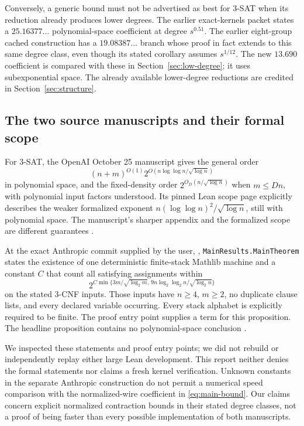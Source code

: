 Conversely, a generic bound must not be advertised as best for 3-SAT when
its reduction already produces lower degrees. The earlier exact-kernels
packet states a $25.16377\ldots$ polynomial-space coefficient at degree
$s^{0.51}$. The earlier eight-group cached construction has a
$19.08387\ldots$ branch whose proof in fact extends to this same degree
class, even though its stated corollary assumes $s^{1/12}$.
The new $13.690$ coefficient is compared with these in
Section~\ref{sec:low-degree}; it uses subexponential space.
The already available lower-degree reductions are credited in
Section~\ref{sec:structure}.

\subsection{The two source manuscripts and their formal scope}

For 3-SAT, the OpenAI October 25 manuscript gives the general order
\[
 (n+m)^{O(1)}2^{O(n\log\log n/\sqrt{\log n})}
\]
in polynomial space, and the fixed-density order
$2^{O_D(n/\sqrt{\log n})}$ when $m\le Dn$, with polynomial input factors
understood. Its pinned Lean scope page explicitly describes the weaker
formalized exponent $n(\log\log n)^2/\sqrt{\log n}$, still with polynomial
space. The manuscript's sharper appendix and the formalized scope are
different guarantees \cite{openai,openai-scope}.

At the exact Anthropic commit supplied by the user, \anthpin,
\texttt{MainResults.MainTheorem} states the existence of one deterministic
finite-stack Mathlib machine and a constant $C$ that count all satisfying
assignments within
\[
 2^{C\min\{3m/\sqrt{\log_2m},\,
                  9n\log_2\log_2n/\sqrt{\log_2n}\}}
\]
on the stated 3-CNF inputs. Those inputs have $n\ge4$, $m\ge2$, no duplicate
clause lists, and every declared variable occurring. Every stack alphabet
is explicitly required to be finite. The proof entry point supplies a
term for this proposition. The headline proposition contains no
polynomial-space conclusion \cite{anthropic-main,anthropic-solution}.

We inspected these statements and proof entry points; we did not rebuild
or independently replay either large Lean development. This report neither
denies the formal statements nor claims a fresh kernel verification.
Unknown constants in the separate Anthropic construction do not permit a
numerical speed comparison with the normalized-wire coefficient in
\eqref{eq:main-bound}. Our claims concern explicit normalized contraction
bounds in their stated degree classes, not a proof of being faster than
every possible implementation of both manuscripts.

